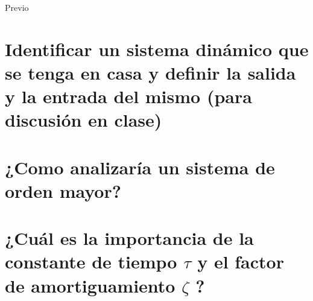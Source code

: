 {\Huge Previo }

\noindent \justifying


\section{Identificar un sistema dinámico que se tenga en casa y definir la salida y la entrada del mismo (para discusión en clase)}
\section{¿Como analizaría un sistema de orden mayor?}
\section{¿Cuál es la importancia de la constante de tiempo $\tau$ y el factor de amortiguamiento $\zeta$ ?}

